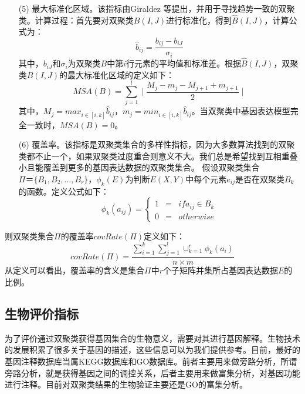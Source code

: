 \begin{enumerate}
    \item[(5)] 最大标准化区域。该指标由Giraldez 等提出，并用于寻找趋势一致的双聚类。计算过程：首先要对双聚类$B(I,J)$进行标准化，得到$\hat{B}(I,J)$，计算公式为：
    \begin{equation}
      \hat{b}_{ij} = \frac{b_{ij}-b_{iJ}}{\sigma_i}
    \end{equation}
    \hspace{2em} 其中，$b_{iJ}$和$\sigma_i$为双聚类$B$中第$i$行元素的平均值和标准差。根据$\hat{B}(I,J)$，双聚类$B(I,J)$的最大标准化区域的定义如下：
    \begin{equation}
      MSA(B) = \sum_{j=1}^l \mid \frac{M_j-m_j-M_{j+1}+m_{j+1}}{2}\mid
    \end{equation}
    \hspace{2em} 其中，$M_j=max_{i\in [i,k]}\hat{b}_{ij}$，$m_j=min_{i\in [i,k]}\hat{b}_{ij}$。当双聚类中基因表达模型完全一致时，$MSA(B)=0$。

    \item[(6)] 覆盖率。该指标是双聚类集合的多样性指标，因为大多数算法找到的双聚类都不止一个，如果双聚类过度重合则意义不大。我们总是希望找到互相重叠小且能覆盖到更多的基因表达数据的双聚类集合。 假设双聚类集合$\Pi＝\{B_1,B_2,...,B_r\}$，$\phi_k(E)$为判断$E(X,Y)$中每个元素$e_{ij}$是否在双聚类$B_k$的函数。定义公式如下：
    \begin{equation}
    \phi_k(a_{ij})  = \left\{
      \begin{aligned}
       1 & = & if a_{ij} \in B_k \\
       0 & = & otherwise 
      \end{aligned}
    \right.
    \end{equation}
  \end{enumerate}
  \hspace{2em}则双聚类集合$\Pi$的覆盖率$covRate(\Pi)$定义如下：
  \begin{equation}
   covRate(\Pi) = \frac{\sum_{i=1}^k\sum_{j=1}^l\cup_{k=1}^r\phi_k(a_i)}{n \times m} 
  \end{equation}
  \hspace{2em}从定义可以看出，覆盖率的含义是集合$\Pi$中$r$个子矩阵并集所占基因表达数据$E$的比例。

  \subsection{生物评价指标}
  为了评价通过双聚类获得基因集合的生物意义，需要对其进行基因解释。生物技术的发展积累了很多关于基因的描述，这些信息可以为我们提供参考。目前，最好的基因注释数据库当属KEGG数据库和GO数据库。前者主要用来做旁路分析，所谓旁路分析，就是获得基因之间的调控关系，后者主要用来做富集分析，对基因功能进行注释。目前对双聚类结果的生物验证主要还是GO的富集分析。

